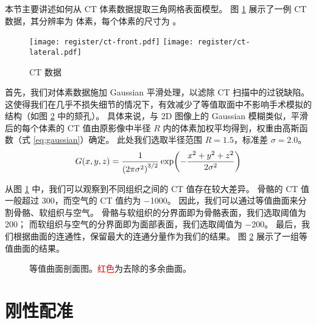 本节主要讲述如何从 CT 体素数据提取三角网格表面模型。
图 \ref{fig:ct} 展示了一例 CT 数据，其分辨率为  体素，每个体素的尺寸为 。

\begin{figure}
  \centering
  \texttt{[image: register/ct-front.pdf]} \quad
  \texttt{[image: register/ct-lateral.pdf]}
  \caption{CT 数据}
  \label{fig:ct}
\end{figure}

首先，我们对体素数据施加 Gaussian 平滑处理，以滤除 CT 扫描中的过锐缺陷。
这使得我们在几乎不损失细节的情况下，有效减少了等值取面中不影响手术模拟的结构（如图 \ref{fig:contour} 中的颏孔）。
具体来说，与 2D 图像上的 Gaussian 模糊类似，平滑后的每个体素的 CT 值由原影像中半径 $R$ 内的体素加权平均得到，权重由高斯函数（式 \eqref{eq:gaussian}）确定。
此处我们选取半径范围 $R = 1.5$，标准差 $\sigma = 2.0$。
\begin{equation} \label{eq:gaussian}
  G(x, y, z) = \frac{1}{\pqty{2 \pi \sigma^2}^{3 / 2}} \exp(- \frac{x^2 + y^2 + z^2}{2 \sigma^2})
\end{equation}

从图 \ref{fig:ct} 中，我们可以观察到不同组织之间的 CT 值存在较大差异。
骨骼的 CT 值一般超过 \num{300}，而空气的 CT 值约为 \num{-1000}。
因此，我们可以通过等值曲面来分割骨骼、软组织与空气。
骨骼与软组织的分界面即为骨骼表面，我们选取阈值为 \num{200}；
而软组织与空气的分界面即为面部表面，我们选取阈值为 \num{-200}。
最后，我们根据曲面的连通性，保留最大的连通分量作为我们的结果。
图 \ref{fig:contour} 展示了一组等值曲面的结果。

\begin{figure}
  \centering
  \caption{等值曲面剖面图。\textcolor{red}{红色}为去除的多余曲面。}
  \label{fig:contour}
\end{figure}

\section{刚性配准}


